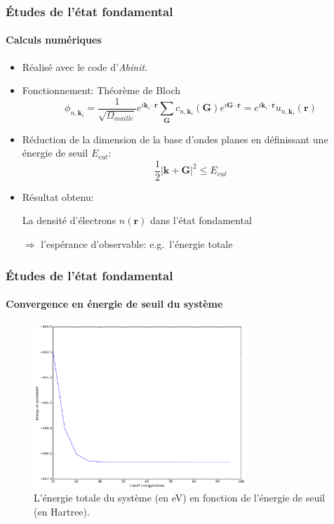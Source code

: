 \documentclass[french]{beamer}
\newcommand{\vb}[1]{\mathbf{#1}}
\begin{document}
\newpage
\begin{frame}
\frametitle{Études de l'état fondamental}
\framesubtitle{Calculs numériques}
\begin{itemize}
  \item Réalisé avec le code d'\textit{Abinit}.
  \item Fonctionnement:
    Théorème de Bloch
    \begin{equation*}
      \phi_{n,\textbf{k}_i}
      = \frac{1}{\sqrt{\Omega_{maille}}}e^{i\textbf{k}_i\cdot\textbf{r}}\sum_{\textbf{G}} c_{n,\textbf{k}_i}(\textbf{G})e^{i\textbf{G}\cdot\textbf{r}}
      = e^{i\textbf{k}_i\cdot\textbf{r}} u_{n,\textbf{k}_i}(\textbf{r})
    \end{equation*}
  \item Réduction de la dimension de la base d'ondes planes en définissant une énergie de seuil $E_{cut}$:
    \begin{equation}
      \frac{1}{2}|\textbf{k}+\textbf{G}|^2 \leq E_{cut}
    \end{equation}

  \item Résultat obtenu:

    La densité d'électrons $n(\vb{r})$ dans l'état fondamental

    $\Rightarrow$ l'espérance d'observable: e.g.\ l'énergie totale

\end{itemize}

\end{frame}

\begin{frame}
\frametitle{Études de l'état fondamental}
\framesubtitle{Convergence en énergie de seuil du système}
\begin{figure}[!h]
    \centering
    \includegraphics[width=8cm]{E_cut}
    \caption{L'énergie totale du système (en eV) en fonction de l'énergie de seuil (en Hartree).}\label{fig-Ecut}
\end{figure}
\end{frame}
\end{document}
